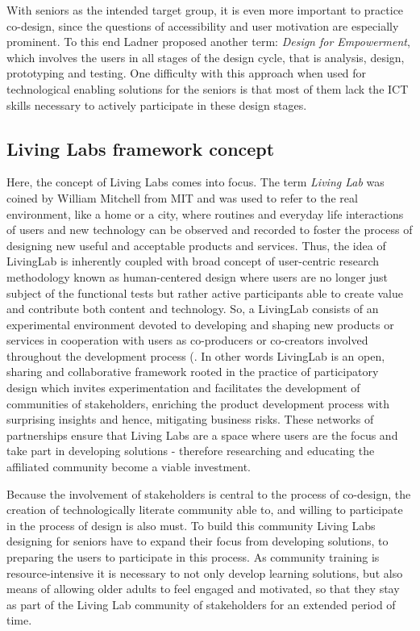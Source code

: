 \documentclass[sigconf]{acmart}
\begin{document}
With seniors as the intended target group, it is even more important to practice co-design, since the questions of accessibility and user motivation are especially prominent. To this end Ladner \cite{ladner2015design} proposed another term: \textit{Design for Empowerment}, which involves the users in all stages of the design cycle, that is analysis, design, prototyping and testing. One difficulty with this approach when used for technological enabling solutions for the seniors is that most of them lack the ICT skills necessary to actively participate in these design stages.

\subsection{Living Labs framework concept}

Here, the concept of Living Labs comes into focus. The term \textit{Living Lab} was coined by William Mitchell from MIT \cite{niitamo2006state} and was used to refer to the real environment, like a home or a city, where routines and everyday life interactions of users and new technology can be observed and recorded to foster the process of designing new useful and acceptable products and services. Thus, the idea of LivingLab is inherently coupled with broad concept of user-centric research methodology known as human-centered design where users are no longer just subject of the functional tests but rather active participants  able to create value and contribute both content and technology. So, a LivingLab consists of an experimental environment devoted to developing and shaping new products or services in cooperation with users as co-producers or co-creators involved throughout the development process (\cite{ballon2005test,schumacher2007living}. In other words LivingLab is an open, sharing and collaborative framework rooted in the practice of participatory design which invites experimentation and facilitates the development of communities of stakeholders, enriching the product development process with surprising insights and hence, mitigating business risks.\cite{pallot2010living} These networks of partnerships ensure that Living Labs are a space where users are the focus and take part in developing solutions - therefore researching and educating the affiliated community become a viable investment.

Because the involvement of stakeholders is central to the process of co-design, the creation of technologically literate community able to, and willing to participate in the process of design is also must. To build this community Living Labs designing for seniors have to expand their focus from developing solutions, to preparing the users to participate in this process. As community training is resource-intensive it is necessary to not only develop learning solutions, but also means of allowing older adults to feel engaged and motivated, so that they stay as part of the Living Lab community of stakeholders for an extended period of time.
\end{document}
